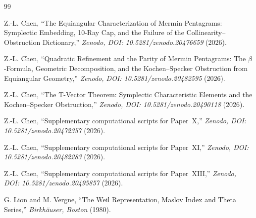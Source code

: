 \documentclass[11pt,a4paper]{article}
\theoremstyle{remark}
\begin{document}
\begin{thebibliography}{99}

Z.-L. Chen,
``The Equiangular Characterization of Mermin Pentagrams:
Symplectic Embedding, 10-Ray Cap, and the Failure of the
Collinearity--Obstruction Dictionary,''
\textit{Zenodo, DOI: 10.5281/zenodo.20476659} (2026).

Z.-L. Chen,
``Quadratic Refinement and the Parity of Mermin Pentagrams:
The $\beta$-Formula, Geometric Decomposition, and the
Kochen--Specker Obstruction from Equiangular Geometry,''
\textit{Zenodo, DOI: 10.5281/zenodo.20482595} (2026).

Z.-L. Chen,
``The T-Vector Theorem: Symplectic Characteristic Elements
and the Kochen--Specker Obstruction,''
\textit{Zenodo, DOI: 10.5281/zenodo.20490118} (2026).

Z.-L. Chen,
``Supplementary computational scripts for Paper~X,''
\textit{Zenodo, DOI: 10.5281/zenodo.20472357} (2026).

Z.-L. Chen,
``Supplementary computational scripts for Paper~XI,''
\textit{Zenodo, DOI: 10.5281/zenodo.20482283} (2026).

Z.-L. Chen,
``Supplementary computational scripts for Paper~XIII,''
\textit{Zenodo, DOI: 10.5281/zenodo.20495857} (2026).

G. Lion and M. Vergne,
``The Weil Representation, Maslov Index and Theta Series,''
\textit{Birkh\"auser, Boston} (1980).

\end{thebibliography}
\end{document}
